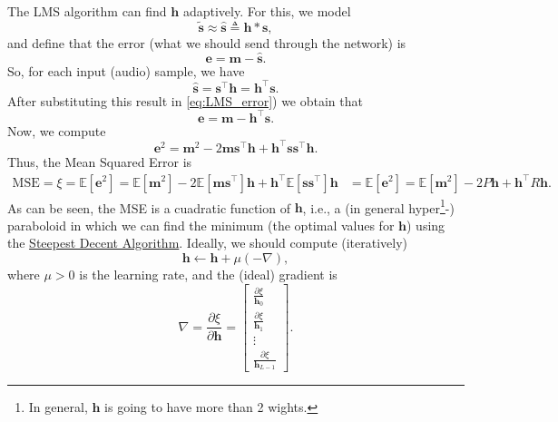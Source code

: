 The LMS algorithm can find $\mathbf{h}$ adaptively. For this, we model
\begin{equation}
  \tilde{\mathbf{s}} \approx \hat{\mathbf{s}} \triangleq \mathbf{h} * \mathbf{s},
\end{equation}and define that the error (what we should send through the network) is
\begin{equation}
  \mathbf{e}=\mathbf{m}-\hat{\mathbf{s}}.
  \label{eq:LMS_error}
\end{equation}
So, for each input (audio) sample, we have
\begin{equation}
  \hat{\mathbf{s}} = \mathbf{s}^\top\mathbf{h} = \mathbf{h}^\top\mathbf{s}.
\end{equation}
After substituting this result in \eqref{eq:LMS_error}) we obtain that
\begin{equation}
  \mathbf{e}=\mathbf{m} - \mathbf{h}^\top\mathbf{s}.
\end{equation}
Now, we compute
\begin{equation}
  \mathbf{e}^2 = \mathbf{m}^2 - 2\mathbf{m}\mathbf{s}^\top\mathbf{h} + \mathbf{h}^\top\mathbf{s}\mathbf{s}^\top\mathbf{h}.
  \label{eq:e_squared}
\end{equation}
Thus, the Mean Squared Error is
\begin{equation}
  \begin{split}
  \text{MSE} = \xi = \mathbb{E}[\mathbf{e}^2] = \mathbb{E}[\mathbf{m}^2] - 2\mathbb{E}[\mathbf{m}\mathbf{s}^\top]\mathbf{h} + \mathbf{h}^\top\mathbb{E}[\mathbf{s}\mathbf{s}^\top]\mathbf{h} & = \mathbb{E}[\mathbf{e}^2] = \mathbb{E}[\mathbf{m}^2] - 2P\mathbf{h} + \mathbf{h}^\top R\mathbf{h}.
    \end{split}
\end{equation}
As can be seen, the MSE is a cuadratic function of $\mathbf{h}$, i.e.,
a (in general hyper\footnote{In general, $\mathbf{h}$ is going to have
more than 2 wights.}-) paraboloid in which we can find the minimum
(the optimal values for $\mathbf{h}$) using the
\href{https://en.wikipedia.org/wiki/Method_of_steepest_descent}{Steepest
  Decent Algorithm}. Ideally, we should compute (iteratively)
\begin{equation}
  \mathbf{h}\leftarrow\mathbf{h}+\mu(-\nabla),
\end{equation}
where $\mu>0$ is the learning rate, and the (ideal) gradient is
\begin{equation}
  \nabla = \frac{\partial\xi}{\partial\mathbf{h}} =
  \begin{bmatrix}
    \frac{\partial\xi}{\mathbf{h}_0} \\
    \frac{\partial\xi}{\mathbf{h}_1} \\
    \vdots \\
    \frac{\partial\xi}{\mathbf{h}_{L-1}}
  \end{bmatrix}.
\end{equation}
